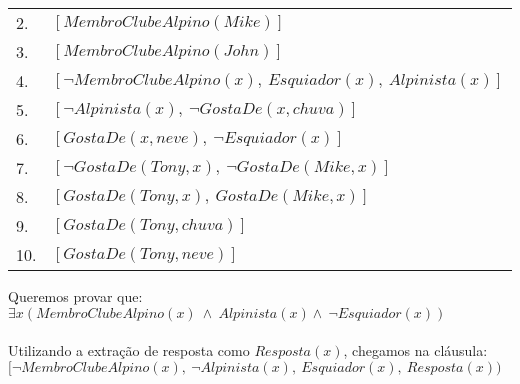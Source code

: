 \documentclass[12pt]{article}
\begin{document}
\begin{itemize}
\begin{itemize}
\begin{center}
\begin{tabular}{l|l}
						2. & $[MembroClubeAlpino(Mike)]$\\
						3. & $[MembroClubeAlpino(John)]$\\
						4. & $[\neg MembroClubeAlpino(x), \ Esquiador(x), \ Alpinista(x)] $ \\
						5. & $[\neg Alpinista(x), \ \neg GostaDe(x, chuva)] $\\
						6. & $[GostaDe(x, neve), \  \neg Esquiador(x)]$\\
						7. & $[\neg GostaDe(Tony, x), \  \neg GostaDe(Mike, x)]$\\
						8. & $[GostaDe(Tony, x), \  GostaDe(Mike, x)]$\\
						9. & $[GostaDe(Tony, chuva)]$\\
						10. & $[GostaDe(Tony, neve)]$\\			
					\end{tabular}
				\end{center}
				Queremos provar que:\\
				$\exists x (MembroClubeAlpino(x) \ \wedge \ Alpinista(x) \wedge \  
				\neg Esquiador(x))$\\ \\
				Utilizando a extração de resposta como $Resposta(x)$, chegamos na cláusula:\\
				$[\neg MembroClubeAlpino(x), \  \neg Alpinista(x),  \ Esquiador(x),
				\ Resposta(x))$\\
			\end{itemize}
	\end{itemize}
\end{document}
